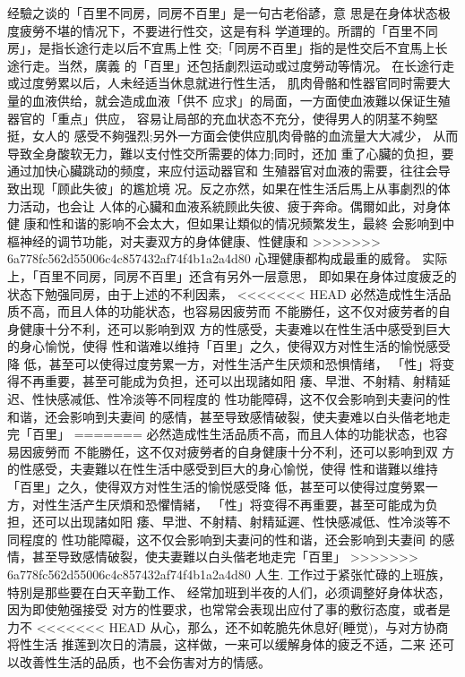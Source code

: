 \documentclass[12pt,UTF8]{ctexbook}
\begin{document}
经驗之谈的「百里不同房，同房不百里」是一句古老俗諺，意
思是在身体状态极度疲勞不堪的情况下，不要进行性交，这是有科
学道理的。所謂的「百里不同房」，是指长途行走以后不宜馬上性
交;「同房不百里」指的是性交后不宜馬上长途行走。当然，廣義
的「百里」还包括劇烈运动或过度勞动等情况。
在长途行走或过度勞累以后，人未经适当休息就进行性生活，
肌肉骨骼和性器官同时需要大量的血液供给，就会造成血液「供不
应求」的局面，一方面使血液難以保证生殖器官的「重点」供应，
容易让局部的充血状态不充分，使得男人的阴茎不夠堅挺，女人的
感受不夠强烈;另外一方面会使供应肌肉骨骼的血流量大大减少，
从而导致全身酸软无力，難以支付性交所需要的体力;同时，还加
重了心臟的负担，要通过加快心臟跳动的频度，来应付运动器官和
生殖器官对血液的需要，往往会导致出现「顾此失彼」的尷尬境
况。反之亦然，如果在性生活后馬上从事劇烈的体力活动，也会让
人体的心臟和血液系統顾此失彼、疲于奔命。偶爾如此，对身体健
康和性和谐的影响不会太大，但如果让類似的情况频繁发生，最終
会影响到中樞神经的调节功能，对夫妻双方的身体健康、性健康和
>>>>>>> 6a778fc562d55006c4c857432af74f4b1a2a4d80
心理健康都构成最重的威脅。
实际上，「百里不同房，同房不百里」还含有另外一层意思，
即如果在身体过度疲乏的状态下勉强同房，由于上述的不利因素，
<<<<<<< HEAD
必然造成性生活品质不高，而且人体的功能状态，也容易因疲劳而
不能勝任，这不仅对疲劳者的自身健康十分不利，还可以影响到双
方的性感受，夫妻难以在性生活中感受到巨大的身心愉悦，使得
性和谐难以维持「百里」之久，使得双方对性生活的愉悦感受降
低，甚至可以使得过度劳累一方，对性生活产生厌烦和恐惧情绪，
「性」将变得不再重要，甚至可能成为负担，还可以出现諸如阳
痿、早泄、不射精、射精延迟、性快感减低、性冷淡等不同程度的
性功能障碍，这不仅会影响到夫妻问的性和谐，还会影响到夫妻间
的感情，甚至导致感情破裂，使夫妻难以白头偕老地走完「百里」
=======
必然造成性生活品质不高，而且人体的功能状态，也容易因疲勞而
不能勝任，这不仅对疲勞者的自身健康十分不利，还可以影响到双
方的性感受，夫妻難以在性生活中感受到巨大的身心愉悦，使得
性和谐難以维持「百里」之久，使得双方对性生活的愉悦感受降
低，甚至可以使得过度勞累一方，对性生活产生厌煩和恐懼情緒，
「性」将变得不再重要，甚至可能成为负担，还可以出现諸如阳
痿、早泄、不射精、射精延遲、性快感减低、性冷淡等不同程度的
性功能障礙，这不仅会影响到夫妻问的性和谐，还会影响到夫妻间
的感情，甚至导致感情破裂，使夫妻難以白头偕老地走完「百里」
>>>>>>> 6a778fc562d55006c4c857432af74f4b1a2a4d80
人生.
工作过于紧张忙碌的上班族，特別是那些要在白天辛勤工作、
经常加班到半夜的人们，必须调整好身体状态，因为即使勉强接受
对方的性要求，也常常会表现出应付了事的敷衍态度，或者是力不
<<<<<<< HEAD
从心，那么，还不如乾脆先休息好(睡觉)，与对方协商将性生活
推莲到次日的清晨，这样做，一来可以缓解身体的疲乏不适，二来
还可以改善性生活的品质，也不会伤害对方的情感。
\end{document}
